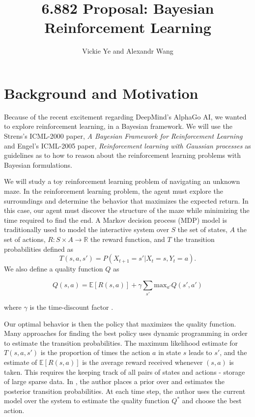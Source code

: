 \documentclass[11pt, twoside]{article}
\title{6.882 Proposal: Bayesian Reinforcement Learning}
\date{}
\author {Vickie Ye and Alexandr Wang}
\begin{document}
\maketitle

\section{Background and Motivation}
Because of the recent excitement regarding DeepMind's AlphaGo AI, we wanted to
explore reinforcement learning, in a Bayesian framework. We will use the Strens's
ICML-2000 paper, \textit{A Bayesian Framework for Reinforcement Learning} and Engel's ICML-2005 paper, \textit{Reinforcement learning with Gaussian processes} as
guidelines as to how to reason about the reinforcement learning problems with Bayesian formulations.

We will study a toy reinforcement learning problem of navigating an unknown maze.
In the reinforcement learning problem, the agent must explore the surroundings
and determine the behavior that maximizes the expected return. In this case, our
agent must discover the structure of the maze while minimizing the time required
to find the end. A Markov decision process (MDP) model is traditionally used to
model the interactive system over $S$ the set of states, $A$ the set of actions,
$R: S \times A \rightarrow \mathbb{R}$ the reward function, and $T$ the transition
probabilities defined as
\begin{equation}
T(s, a, s') = P(X_{t+1} = s' | X_t = s, Y_t = a).
\end{equation}
We also define a quality function $Q$ as

\begin{equation}
Q(s, a) = \mathbb{E}[R(s, a)] + \gamma \sum_{s'} \textrm{max}_{a'} Q(s', a')
\end{equation}

where $\gamma$ is the time-discount factor \citep[p.3]{strens}.

Our optimal behavior is then the policy that maximizes the quality function. Many
approaches for finding the best policy uses dynamic programming in order to estimate
the transition probabilities. The maximum likelihood estimate for $T(s, a, s')$ is
the proportion of times the action $a$ in state $s$ leads to $s'$, and the estimate of
$\mathbb{E}[R(s, a)]$ is the average reward received whenever $(s, a)$ is taken. This
requires the keeping track of all pairs of states and actions - storage of large
sparse data. In \cite{strens}, the author places a prior over and estimates the
posterior transition probabilities. At each time step, the author uses the current
model over the system to estimate the quality function $Q^*$ and choose the best
action. 
\end{document}
